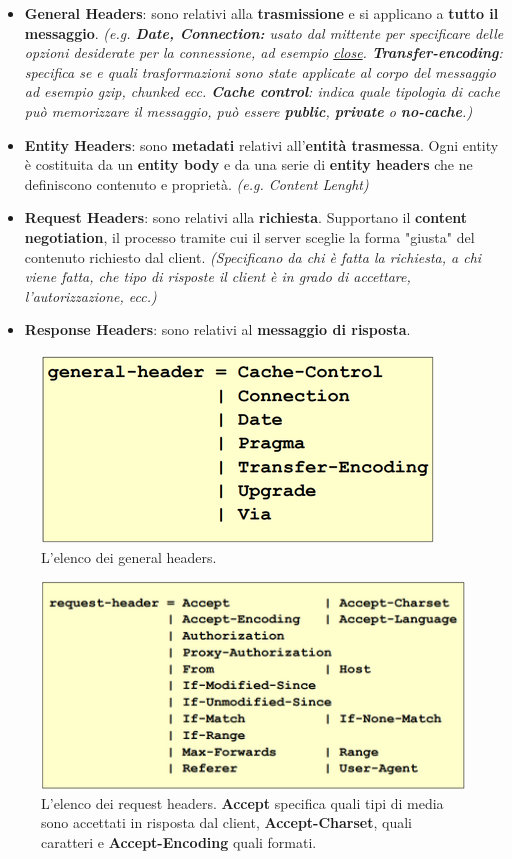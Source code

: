 \documentclass[11pt,a4paper]{article}
\theoremstyle{definition}
\begin{document}
\begin{itemize}
	\item \textbf{General Headers}: sono relativi alla \textbf{trasmissione} e si applicano a \textbf{tutto il messaggio}. \textit{(e.g. \textbf{Date, Connection:} usato dal mittente per specificare delle opzioni desiderate per la connessione, ad esempio \underline{close}. \textbf{Transfer-encoding}: specifica se e quali trasformazioni sono state applicate al corpo del messaggio ad esempio gzip, chunked ecc. \textbf{Cache control}: indica quale tipologia di cache può memorizzare il messaggio, può essere \textbf{public}, \textbf{private} o \textbf{no-cache}.)}
	\item \textbf{Entity Headers}: sono \textbf{metadati} relativi all'\textbf{entità trasmessa}. Ogni entity è costituita da un \textbf{entity body} e da una
	      serie di \textbf{entity headers} che ne definiscono contenuto e
	      proprietà. \textit{(e.g. Content Lenght)}
	\item \textbf{Request Headers}: sono relativi alla \textbf{richiesta}. Supportano il \textbf{content negotiation}, il processo tramite cui il server sceglie la forma "giusta" del contenuto richiesto dal client. \textit{(Specificano da chi è fatta la richiesta, a chi viene fatta, che tipo di risposte il client è in grado di accettare, l'autorizzazione, ecc.)}
	\item \textbf{Response Headers}: sono relativi al \textbf{messaggio di risposta}.
\end{itemize}
\newpage
\begin{figure}[!h]
	\includegraphics[scale=0.31]{Immagini/General_h.png}
	\centering
	\caption{L'elenco dei general headers.}
\end{figure}
\begin{figure}[!h]
	\includegraphics[scale=0.3]{Immagini/Req_h.png}
	\centering
	\caption{L'elenco dei request headers. \textbf{Accept} specifica quali tipi di media sono accettati in risposta dal client, \textbf{Accept-Charset}, quali caratteri e \textbf{Accept-Encoding} quali formati.}
\end{figure}
\end{document}
